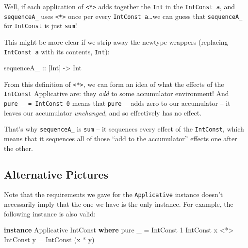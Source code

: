 \documentclass[]{article}
\newenvironment{Shaded}{}{}
\newcommand{\DataTypeTok}[1]{\textcolor[rgb]{0.56,0.13,0.00}{#1}}
\newcommand{\DecValTok}[1]{\textcolor[rgb]{0.25,0.63,0.44}{#1}}
\newcommand{\FunctionTok}[1]{\textcolor[rgb]{0.02,0.16,0.49}{#1}}
\newcommand{\KeywordTok}[1]{\textcolor[rgb]{0.00,0.44,0.13}{\textbf{#1}}}
\newcommand{\NormalTok}[1]{#1}
\newcommand{\OperatorTok}[1]{\textcolor[rgb]{0.40,0.40,0.40}{#1}}
\newcommand{\OtherTok}[1]{\textcolor[rgb]{0.00,0.44,0.13}{#1}}
\begin{document}
Well, if each application of \texttt{\textless{}*\textgreater{}} adds together
the \texttt{Int} in the \texttt{IntConst\ a}, and \texttt{sequenceA\_} uses
\texttt{\textless{}*\textgreater{}} once per every \texttt{IntConst\ a}\ldots we
can guess that \texttt{sequenceA\_} for \texttt{IntConst} is just \texttt{sum}!

This might be more clear if we strip away the newtype wrappers (replacing
\texttt{IntConst\ a} with its contents, \texttt{Int}):

\begin{Shaded}
\begin{Highlighting}[]
\OtherTok{sequenceA\_ ::}\NormalTok{ [}\DataTypeTok{Int}\NormalTok{] }\OtherTok{{-}>} \DataTypeTok{Int}
\end{Highlighting}
\end{Shaded}

From this definition of \texttt{\textless{}*\textgreater{}}, we can form an idea
of what the effects of the \texttt{IntConst} Applicative are: they \emph{add} to
some accumulator environment! And \texttt{pure\ \_\ =\ IntConst\ 0} means that
\texttt{pure\ \_} adds zero to our accumulator -- it leaves our accumulator
\emph{unchanged}, and so effectively has no effect.

That's why \texttt{sequenceA\_} is \texttt{sum} -- it sequences every effect of
the \texttt{IntConst}, which means that it sequences all of those ``add to the
accumulator'' effects one after the other.

\hypertarget{alternative-pictures}{%
\subsection{Alternative Pictures}\label{alternative-pictures}}

Note that the requirements we gave for the \texttt{Applicative} instance doesn't
necessarily imply that the one we have is the only instance. For example, the
following instance is also valid:

\begin{Shaded}
\begin{Highlighting}[]
\KeywordTok{instance} \DataTypeTok{Applicative} \DataTypeTok{IntConst} \KeywordTok{where}
    \FunctionTok{pure}\NormalTok{ \_                    }\OtherTok{=} \DataTypeTok{IntConst} \DecValTok{1}
    \DataTypeTok{IntConst}\NormalTok{ x }\OperatorTok{<*>} \DataTypeTok{IntConst}\NormalTok{ y }\OtherTok{=} \DataTypeTok{IntConst}\NormalTok{ (x }\OperatorTok{*}\NormalTok{ y)}
\end{Highlighting}
\end{Shaded}
\end{document}
